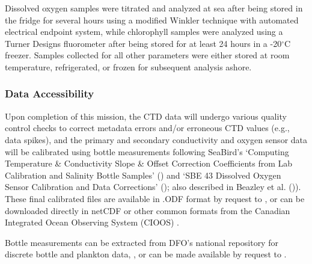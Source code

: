 \documentclass[12pt]{article}\usepackage[]{graphicx}\usepackage[]{color}
\begin{document}
Dissolved oxygen samples were titrated and analyzed at sea after being stored in the fridge for several hours using a modified Winkler technique with automated electrical endpoint system, while chlorophyll samples were analyzed using a Turner Designs fluorometer after being stored for at least 24 hours in a -20\(^\circ\)C freezer. Samples collected for all other parameters were either stored at room temperature, refrigerated, or frozen for subsequent analysis ashore.

\subsubsection{Data Accessibility}\label{data-accessibility}

Upon completion of this mission, the CTD data will undergo various quality control checks to correct metadata errors and/or erroneous CTD values (e.g., data spikes), and the primary and secondary conductivity and oxygen sensor data will be calibrated using bottle measurements following SeaBird's `Computing Temperature \& Conductivity Slope \& Offset Correction Coefficients from Lab Calibration and Salinity Bottle Samples'  () and `SBE 43 Dissolved Oxygen Sensor Calibration and Data Corrections'  (); also described in Beazley et al. ()). These final calibrated files are available in .ODF format by request to , or can be downloaded directly in netCDF or other common formats from the Canadian Integrated Ocean Observing System (CIOOS) .

Bottle measurements can be extracted from DFO's national repository for discrete bottle and plankton data, , or can be made available by request to .
\end{document}
